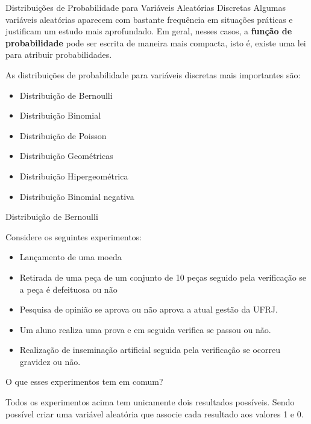 \begin{frame}{Distribuições de Probabilidade para Variáveis Aleatórias Discretas}
    Algumas variáveis aleatórias aparecem com bastante frequência em situações práticas e justificam um estudo mais aprofundado. Em geral, nesses casos, a \textbf{função de probabilidade} pode ser escrita de maneira mais compacta, isto é, existe uma lei para atribuir probabilidades. 

    As distribuições de probabilidade para variáveis discretas mais importantes são:

    \begin{itemize}
        \item Distribuição de Bernoulli
        \item Distribuição Binomial 
        \item Distribuição de Poisson
        \item Distribuição Geométricas
        \item Distribuição Hipergeométrica
        \item Distribuição Binomial negativa
    \end{itemize}
\end{frame}

\begin{frame}{Distribuição de Bernoulli}

Considere os seguintes experimentos:

\begin{itemize}
    \item Lançamento de uma moeda 
    \item Retirada de uma peça de um conjunto de 10 peças seguido pela verificação se a peça é defeituosa ou não
    \item Pesquisa de opinião se aprova ou não aprova a atual gestão da UFRJ. 
    \item Um aluno realiza uma prova e em seguida verifica se passou ou não. 
    \item Realização de inseminação artificial seguida pela verificação se ocorreu gravidez ou não.
\end{itemize}

    O que esses experimentos tem em comum?

    \pause

    Todos os experimentos acima tem unicamente dois resultados possíveis. Sendo possível criar uma variável aleatória que associe cada resultado aos valores 1 e 0. 
\end{frame}

